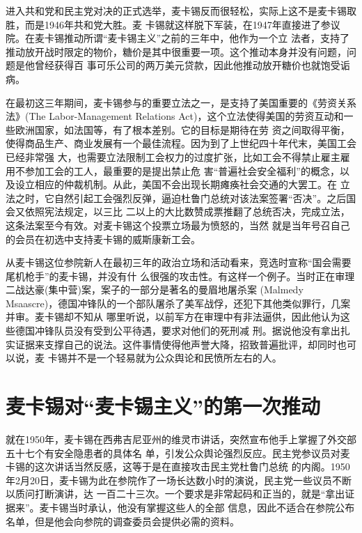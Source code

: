 \documentclass[10pt]{article}
\begin{document}
{进入共和党和民主党对决的正式选举，麦卡锡反而很轻松，实际上这不是麦卡锡取胜，而是1946年共和党大胜。麦
卡锡就这样脱下军装，在1947年直接进了参议院。在麦卡锡推动所谓``麦卡锡主义''之前的三年中，他作为一个立
法者，支持了推动放开战时限定的物价，糖价是其中很重要一项。这个推动本身并没有问题，问题是他曾经获得百
事可乐公司的两万美元贷款，因此他推动放开糖价也就饱受诟病。

在最初这三年期间，麦卡锡参与的重要立法之一，是支持了美国重要的《劳资关系法》(The Labor-Management
Relations Act)，这个立法使得美国的劳资互动和一些欧洲国家，如法国等，有了根本差别。它的目标是期待在劳
资之间取得平衡，使得商品生产、商业发展有一个最佳流程。因为到了上世纪四十年代末，美国工会已经非常强
大，也需要立法限制工会权力的过度扩张，比如工会不得禁止雇主雇用不参加工会的工人，最重要的是提出禁止危
害``普遍社会安全福利''的概念，以及设立相应的仲裁机制。从此，美国不会出现长期瘫痪社会交通的大罢工。在
立法之时，它自然引起工会强烈反弹，逼迫杜鲁门总统对该法案签署``否决''。之后国会又依照宪法规定，以三比
二以上的大比数赞成票推翻了总统否决，完成立法，这条法案至今有效。对麦卡锡这个投票立场最为愤怒的，当然
就是当年号召自己的会员在初选中支持麦卡锡的威斯康新工会。

从麦卡锡这位参院新人在最初三年的政治立场和活动看来，竞选时宣称``国会需要尾机枪手''的麦卡锡，并没有什
么很强的攻击性。有这样一个例子。当时正在审理二战达豪(集中营)案，案子的一部分是著名的曼眉地屠杀案
(Malmedy Msaascre)，德国冲锋队的一个部队屠杀了美军战俘，还犯下其他类似罪行，几案并审。麦卡锡却不知从
哪里听说，以前军方在审理中有非法逼供，因此他认为这些德国冲锋队员没有受到公平待遇，要求对他们的死刑减
刑。据说他没有拿出扎实证据来支撑自己的说法。这件事情使得他声誉大降，招致普遍批评，却同时也可以说，麦
卡锡并不是一个轻易就为公众舆论和民愤所左右的人。


\pagebreak
\section{麦卡锡对``麦卡锡主义''的第一次推动}

就在1950年，麦卡锡在西弗吉尼亚州的维灵市讲话，突然宣布他手上掌握了外交部五十七个有安全隐患者的具体名
单，引发公众舆论强烈反应。民主党参议员对麦卡锡的这次讲话当然反感，这等于是在直接攻击民主党杜鲁门总统
的内阁。1950年2月20日，麦卡锡为此在参院作了一场长达数小时的演说，民主党一些议员不断以质问打断演讲，达
一百二十三次。一个要求是非常起码和正当的，就是``拿出证据来''。麦卡锡当时承认，他没有掌握这些人的全部
信息，因此不适合在参院公布名单，但是他会向参院的调查委员会提供必需的资料。

}
\end{document}
